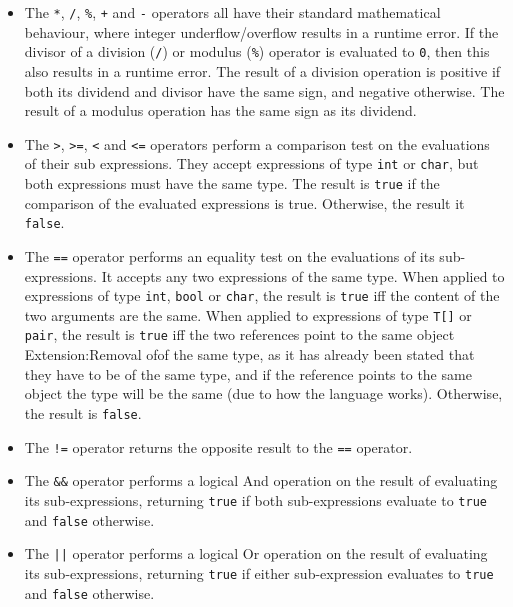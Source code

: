 \documentclass[a4paper]{article}
\theoremstyle{definition}
\begin{document}
\begin{itemize}
\item The \texttt{*}, \texttt{/}, \texttt{\%}, \texttt{+} and \texttt{-} operators
all have their standard mathematical behaviour, where integer underflow/overflow results in a runtime error.
If the divisor of a division (\texttt{/}) or modulus (\texttt{\%}) operator is evaluated to \texttt{0}, then this also results in a runtime error.
The result of a division operation is positive if both its dividend and divisor have the same sign, and negative otherwise.
The result of a modulus operation has the same sign as its dividend.

\item The \texttt{>}, \texttt{>=}, \texttt{<} and \texttt{<=} operators perform a comparison test on the evaluations of their sub expressions.
They accept expressions of type \texttt{int} or \texttt{char}, but both expressions must have the same type.
The result is \texttt{true} if the comparison of the evaluated expressions is true.
Otherwise, the result it \texttt{false}.

\item The \texttt{==} operator performs an equality test on the evaluations of its sub-expressions.
It accepts any two expressions of the same type.
When applied to expressions of type \texttt{int}, \texttt{bool} or \texttt{char}, the result is \texttt{true} iff the content of the two arguments are the same.
When applied to expressions of type \texttt{T[]} or \texttt{pair}, the result is \texttt{true} iff the two references point to the same object Extension:Removal of{of the same type}, as it has already been stated that they have to be of the same type, and if the reference points to the same object the type will be the same (due to how the language works).
Otherwise, the result is \texttt{false}.

\item The \texttt{!=} operator returns the opposite result to the \texttt{==} operator.

\item The \texttt{\&\&} operator performs a logical And operation on the result of evaluating its sub-expressions,
returning \texttt{true} if both sub-expressions evaluate to \texttt{true} and \texttt{false} otherwise.

\item The \texttt{||} operator performs a logical Or operation on the result of evaluating its sub-expressions,
returning \texttt{true} if either sub-expression evaluates to \texttt{true} and \texttt{false} otherwise.
\end{itemize}
\end{document}
